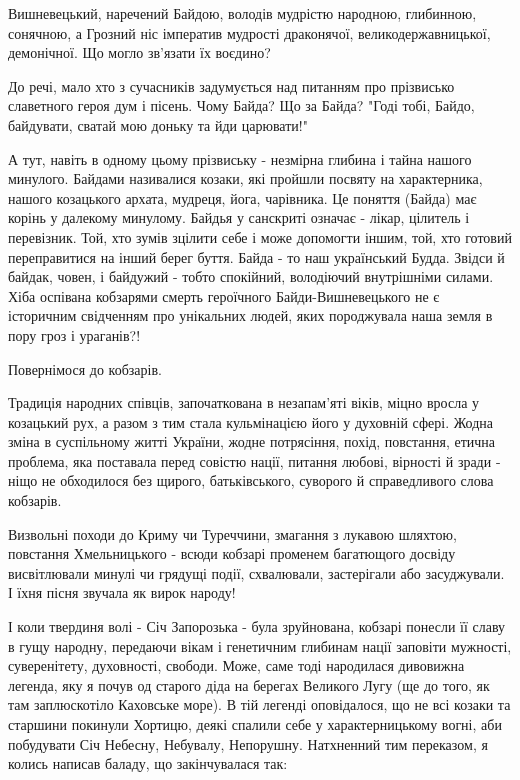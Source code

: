 Вишневецький, наречений Байдою, володів мудрістю народною, глибинною, сонячною,
а Грозний ніс імператив мудрості драконячої, великодержавницької, демонічної.
Що могло зв'язати їх воєдино?

До речі, мало хто з сучасників задумується над питанням про прізвисько
славетного героя дум і пісень. Чому Байда? Що за Байда? "Годі тобі, Байдо,
байдувати, сватай мою доньку та йди царювати!"

А тут, навіть в одному цьому прізвиську - незмірна глибина і тайна нашого
минулого. Байдами називалися козаки, які пройшли посвяту на характерника,
нашого козацького архата, мудреця, йога, чарівника. Це поняття (Байда) має
корінь у далекому минулому. Байдья у санскриті означає - лікар, цілитель і
перевізник. Той, хто зумів зцілити себе і може допомогти іншим, той, хто
готовий переправитися на інший берег буття. Байда - то наш український Будда.
Звідси й байдак, човен, і байдужий - тобто спокійний, володіючий внутрішніми
силами. Хіба оспівана кобзарями смерть героїчного Байди-Вишневецького не є
історичним свідченням про унікальних людей, яких породжувала наша земля в пору
гроз і ураганів?!

Повернімося до кобзарів.

Традиція народних співців, започаткована в незапам'яті віків, міцно вросла у
козацький рух, а разом з тим стала кульмінацією його у духовній сфері. Жодна
зміна в суспільному житті України, жодне потрясіння, похід, повстання, етична
проблема, яка поставала перед совістю нації, питання любові, вірності й зради -
ніщо не обходилося без щирого, батьківського, суворого й справедливого слова
кобзарів.

Визвольні походи до Криму чи Туреччини, змагання з лукавою шляхтою, повстання
Хмельницького - всюди кобзарі променем багатющого досвіду висвітлювали минулі
чи грядущі події, схвалювали, застерігали або засуджували. І їхня пісня звучала
як вирок народу!

І коли твердиня волі - Січ Запорозька - була зруйнована, кобзарі понесли її
славу в гущу народну, передаючи вікам і генетичним глибинам нації заповіти
мужності, суверенітету, духовності, свободи. Може, саме тоді народилася
дивовижна легенда, яку я почув од старого діда на берегах Великого Лугу (ще до
того, як там заплюскотіло Каховське море). В тій легенді оповідалося, що не всі
козаки та старшини покинули Хортицю, деякі спалили себе у характерницькому
вогні, аби побудувати Січ Небесну, Небувалу, Непорушну. Натхненний тим
переказом, я колись написав баладу, що закінчувалася так:

